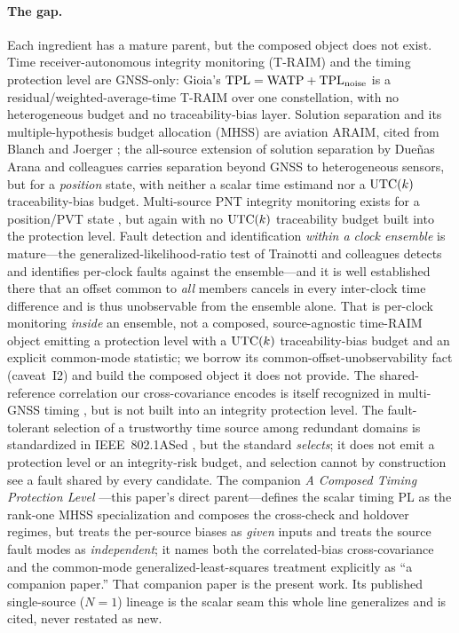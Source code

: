 \paragraph{The gap.}
Each ingredient has a mature parent, but the composed object does not exist. Time
receiver-autonomous integrity monitoring (T-RAIM) and the timing protection level
are GNSS-only: Gioia's $\mathrm{TPL}=\mathrm{WATP}+\mathrm{TPL}_{\mathrm{noise}}$
\citep{gioia2023} is a residual/weighted-average-time T-RAIM over one constellation,
with no heterogeneous budget and no traceability-bias layer. Solution separation
and its multiple-hypothesis budget allocation (MHSS) are aviation ARAIM, cited from
Blanch \citep{blanch2015} and Joerger \citep{joerger2014}; the all-source extension
of solution separation by Due{\~n}as Arana and colleagues \citep{duenasarana2020}
carries separation beyond GNSS to heterogeneous sensors, but for a \emph{position}
state, with neither a scalar time estimand nor a $\mathrm{UTC}(k){}$ traceability-bias budget.
Multi-source PNT integrity monitoring exists for a position/PVT state
\citep{chen2023multisource}, but again with no $\mathrm{UTC}(k){}$ traceability budget built
into the protection level. Fault detection and identification \emph{within a clock
ensemble} is mature---the generalized-likelihood-ratio test of Trainotti and
colleagues \citep{trainotti2022} detects and identifies per-clock faults against the
ensemble---and it is well established there that an offset common to \emph{all}
members cancels in every inter-clock time difference and is thus unobservable from
the ensemble alone. That is per-clock monitoring \emph{inside} an ensemble, not a
composed, source-agnostic time-RAIM object emitting a protection level with a
$\mathrm{UTC}(k){}$ traceability-bias budget and an explicit common-mode statistic; we borrow
its common-offset-unobservability fact (caveat~I2) and build the composed object it
does not provide. The shared-reference correlation our cross-covariance encodes is
itself recognized in multi-GNSS timing \citep{sesia2021}, but is not built into an
integrity protection level.
The fault-tolerant selection of a trustworthy time source among redundant domains is
standardized in IEEE~802.1ASed \citep{ieee8021ased}, but the standard
\emph{selects}; it does not emit a protection level or an integrity-risk budget, and
selection cannot by construction see a fault shared by every candidate. The
companion \emph{A Composed Timing Protection Level} \citep{baweja2026cti}---this
paper's direct parent---defines the scalar timing PL as the rank-one MHSS
specialization and composes the cross-check and holdover regimes, but treats the
per-source biases as \emph{given} inputs and treats the source fault modes as
\emph{independent}; it names both the correlated-bias cross-covariance and the
common-mode generalized-least-squares treatment explicitly as ``a companion
paper.'' That companion paper is the present work. Its published single-source
($N=1$) lineage \citep{baweja2026tpl} is the scalar seam this whole line
generalizes and is cited, never restated as new.

